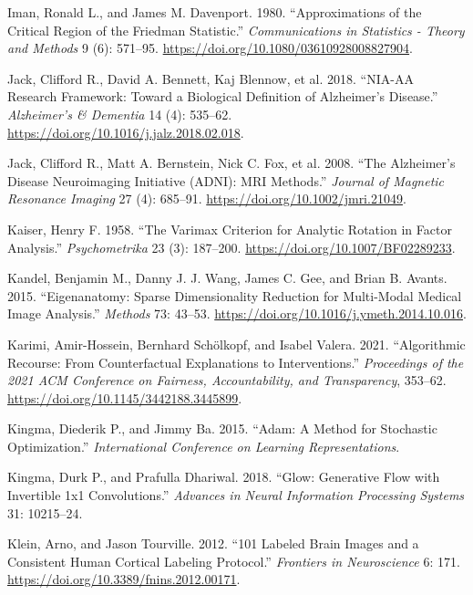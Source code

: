 \documentclass[
  10pt,
  letterpaper,
]{report}
\newlength{\cslhangindent}
\newenvironment{CSLReferences}[2] %
 {\begin{list}{}{%
  \setlength{\itemindent}{0pt}
  \setlength{\leftmargin}{0pt}
  \setlength{\parsep}{0pt}
  \ifodd #1
   \setlength{\leftmargin}{\cslhangindent}
   \setlength{\itemindent}{-1\cslhangindent}
  \fi
  \setlength{\itemsep}{#2\baselineskip}}}
 {\end{list}}
\begin{document}
\begin{CSLReferences}{1}{1}
Iman, Ronald L., and James M. Davenport. 1980. {``Approximations of the
Critical Region of the {Friedman} Statistic.''} \emph{Communications in
Statistics - Theory and Methods} 9 (6): 571--95.
\url{https://doi.org/10.1080/03610928008827904}.

{Jack, Clifford R., David A. Bennett, Kaj Blennow, et al.} 2018.
{``{NIA-AA} Research Framework: Toward a Biological Definition of
{Alzheimer's} Disease.''} \emph{Alzheimer's \& Dementia} 14 (4):
535--62. \url{https://doi.org/10.1016/j.jalz.2018.02.018}.

{Jack, Clifford R., Matt A. Bernstein, Nick C. Fox, et al.} 2008. {``The
{Alzheimer's Disease Neuroimaging Initiative} ({ADNI}): {MRI}
Methods.''} \emph{Journal of Magnetic Resonance Imaging} 27 (4):
685--91. \url{https://doi.org/10.1002/jmri.21049}.

Kaiser, Henry F. 1958. {``The Varimax Criterion for Analytic Rotation in
Factor Analysis.''} \emph{Psychometrika} 23 (3): 187--200.
\url{https://doi.org/10.1007/BF02289233}.

Kandel, Benjamin M., Danny J. J. Wang, James C. Gee, and Brian B.
Avants. 2015. {``Eigenanatomy: Sparse Dimensionality Reduction for
Multi-Modal Medical Image Analysis.''} \emph{Methods} 73: 43--53.
\url{https://doi.org/10.1016/j.ymeth.2014.10.016}.

Karimi, Amir-Hossein, Bernhard Schölkopf, and Isabel Valera. 2021.
{``Algorithmic Recourse: From Counterfactual Explanations to
Interventions.''} \emph{Proceedings of the 2021 ACM Conference on
Fairness, Accountability, and Transparency}, 353--62.
\url{https://doi.org/10.1145/3442188.3445899}.

Kingma, Diederik P., and Jimmy Ba. 2015. {``Adam: A Method for
Stochastic Optimization.''} \emph{International Conference on Learning
Representations}.

Kingma, Durk P., and Prafulla Dhariwal. 2018. {``Glow: Generative Flow
with Invertible 1x1 Convolutions.''} \emph{Advances in Neural
Information Processing Systems} 31: 10215--24.

Klein, Arno, and Jason Tourville. 2012. {``101 Labeled Brain Images and
a Consistent Human Cortical Labeling Protocol.''} \emph{Frontiers in
Neuroscience} 6: 171. \url{https://doi.org/10.3389/fnins.2012.00171}.


\end{CSLReferences}
\end{document}
